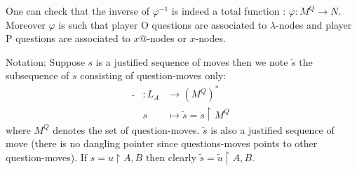One can check that the inverse of $\varphi^{-1}$ is indeed a total function : $\varphi : M^Q \rightarrow N$.
Moreover $\varphi$ is such that player O questions are associated to $\lambda$-nodes
and player P questions are associated to $x @$-nodes or $x$-nodes.


Notation: Suppose $s$ is a justified sequence of moves then we note $\tilde{s}$
the subsequence of $s$ consisting of question-moves only:
\begin{eqnarray*}
\tilde{} &: L_A &\longrightarrow (M^Q)^* \\
& s &\longmapsto \tilde{s} = s \upharpoonright M^Q
\end{eqnarray*}
where $M^Q$ denotes the set of question-moves.
$\tilde{s}$ is also a justified sequence of move (there is no dangling pointer since questions-moves points to other question-moves).
If $s = u\upharpoonright A,B$ then clearly $\tilde{s} = \tilde{u} \upharpoonright A,B$.


